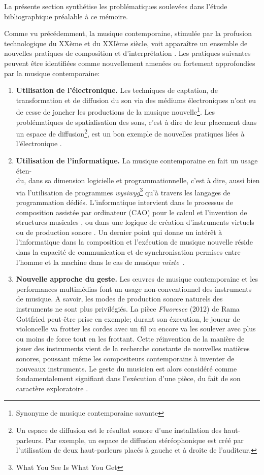 La présente section synthétise les problématiques soulevées dans l'étude bibliographique préalable à ce mémoire.

Comme vu précédemment, la musique contemporaine, stimulée par la profusion technologique du XXème et du XXIème siècle, voit apparaître un ensemble de nouvelles pratiques de composition et d'interprétation \cite{bosseur2005}.
Les pratiques suivantes peuvent être identifiées comme nouvellement amenées ou fortement approfondies par la musique contemporaine:

\begin{enumerate}[label={(\arabic*)}]
	\item \textbf{Utilisation de l'électronique.} Les techniques de captation, de transformation et de diffusion du son via des médiums électroniques n'ont eu de cesse de joncher les productions de la musique nouvelle\footnote{Synonyme de musique contemporaine savante}.
	Les problématiques de spatialisation des sons, c'est à dire de leur placement dans un espace de diffusion\footnote{Un espace de diffusion est le résultat sonore d'une installation des haut-parleurs. Par exemple, un espace de diffusion stéréophonique est créé par l'utilisation de deux haut-parleurs placés à gauche et à droite de l'auditeur.}, est un bon exemple de nouvelles pratiques liées à l'électronique \cite{harley1993}.
	
	\item \textbf{Utilisation de l'informatique.} La musique contemporaine en fait un usage éten-\\du, dans sa dimension logicielle et programmationnelle, c'est à dire, aussi bien via l'utilisation de programmes \textit{wysiwyg}\footnote{What You See Is What You Get} qu'à travers les langages de programmation dédiés. L'informatique intervient dans le processus de composition assistée par ordinateur (CAO) pour le calcul et l'invention de structures musicales \cite{agon1998}, ou dans une logique de création d'instruments virtuels ou de production sonore \cite{puckette1991, mccartney1996}. Un dernier point qui donne un intérêt à l'informatique dans la composition et l'exécution de musique nouvelle réside dans la capacité de communication et de synchronisation permises entre l'homme et la machine dans le cas de musique \textit{mixte}~\cite{cont2008}.
	
	\item \textbf{Nouvelle approche du geste.} Les œuvres de musique contemporaine et les performances multimédias font un usage non-conventionnel des instruments de musique. A savoir, les modes de production sonore naturels des instruments ne sont plus privilégiés. La pièce \textit{Fluoresce} (2012) de Rama Gottfried peut-être prise en exemple; durant son éxecution, le joueur de violoncelle va frotter les cordes avec un fil ou encore va les soulever avec plus ou moins de force tout en les frottant. Cette réinvention de la manière de jouer des instruments vient de la recherche constante de nouvelles matières sonores, poussant même les compositeurs contemporains à inventer de nouveaux instruments. Le geste du musicien est alors considéré comme fondamentalement signifiant dans l'exécution d'une pièce, du fait de son caractère exploratoire \cite{zanpronha2005}.
	

\end{enumerate}

